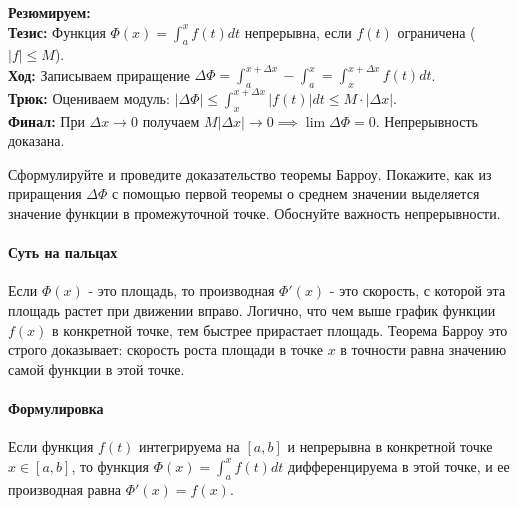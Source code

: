 \begin{tcolorbox}[colback=gray!5, colframe=black, boxrule=0.5pt, arc=0pt]
\textbf{Резюмируем:} \\
\textbf{Тезис:} Функция $\Phi(x) = \int_a^x f(t)dt$ непрерывна, если $f(t)$ ограничена ($|f| \le M$). \\
\textbf{Ход:} Записываем приращение $\Delta \Phi = \int_a^{x+\Delta x} - \int_a^x = \int_x^{x+\Delta x} f(t)dt$. \\
\textbf{Трюк:} Оцениваем модуль: $|\Delta \Phi| \le \int_x^{x+\Delta x} |f(t)| dt \le M \cdot |\Delta x|$. \\
\textbf{Финал:} При $\Delta x \to 0$ получаем $M|\Delta x| \to 0 \implies \lim \Delta \Phi = 0$. Непрерывность доказана.
\end{tcolorbox}


{Сформулируйте и проведите доказательство теоремы Барроу. Покажите, как из приращения $\Delta\Phi$ с помощью первой теоремы о среднем значении выделяется значение функции в промежуточной точке. Обоснуйте важность непрерывности.}

\paragraph{Суть на пальцах}
Если $\Phi(x)$ - это площадь, то производная $\Phi'(x)$ - это скорость, с которой эта площадь растет при движении вправо. Логично, что чем выше график функции $f(x)$ в конкретной точке, тем быстрее прирастает площадь. Теорема Барроу это строго доказывает: скорость роста площади в точке $x$ в точности равна значению самой функции в этой точке. 

\paragraph{Формулировка}
Если функция $f(t)$ интегрируема на $[a, b]$ и непрерывна в конкретной точке $x \in [a, b]$, то функция $\Phi(x) = \int_a^x f(t)dt$ дифференцируема в этой точке, и ее производная равна $\Phi'(x) = f(x)$.

